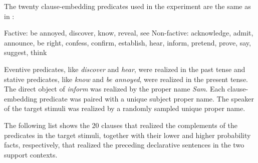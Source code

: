 \documentclass[11pt,fleqn]{article}
\newcommand{\6}{\mbox{$[\hspace*{-.6mm}[$}}
\newcommand{\9}{\mbox{$]\hspace*{-.6mm}]$}}
\begin{document}
The twenty clause-embedding predicates used in the experiment are the same as in \citealt{degen-tonhauser-openmind,degen-tonhauser-language}:

\begin{exe}
\ex\label{predicates}
\begin{xlist}
\ex Factive: be annoyed, discover, know, reveal, see
\ex Non-factive: acknowledge, admit, announce, be right, confess, confirm, establish, hear, inform, pretend, prove, say, suggest, think
\end{xlist}
\end{exe}
Eventive predicates, like {\em discover} and {\em hear}, were realized in the past tense and stative predicates, like {\em know} and {\em be annoyed}, were realized in the present tense. The direct object of {\em inform} was realized by the proper name {\em Sam}. Each clause-embedding predicate was paired with a unique subject proper name. The speaker of the target stimuli was realized by a randomly sampled unique proper name. 

The following list shows the 20 clauses that realized the complements of the predicates in the target stimuli, together with their lower and higher probability facts, respectively, that realized the preceding declarative sentences in the two support contexts.
\end{document}
